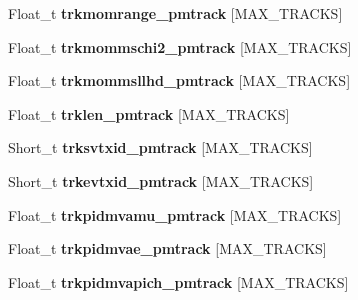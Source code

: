 \begin{DoxyCompactItemize}
\item 
\hypertarget{classanatree_a725421ebaec99bbeaacda2ea1df8ac54}{Float\-\_\-t {\bfseries trkmomrange\-\_\-pmtrack} \mbox{[}M\-A\-X\-\_\-\-T\-R\-A\-C\-K\-S\mbox{]}}\label{classanatree_a725421ebaec99bbeaacda2ea1df8ac54}

\item 
\hypertarget{classanatree_ad6f4b9a484529c39f413d31fdaa51664}{Float\-\_\-t {\bfseries trkmommschi2\-\_\-pmtrack} \mbox{[}M\-A\-X\-\_\-\-T\-R\-A\-C\-K\-S\mbox{]}}\label{classanatree_ad6f4b9a484529c39f413d31fdaa51664}

\item 
\hypertarget{classanatree_a7c538c0f882a2b346b7af037a89b9d00}{Float\-\_\-t {\bfseries trkmommsllhd\-\_\-pmtrack} \mbox{[}M\-A\-X\-\_\-\-T\-R\-A\-C\-K\-S\mbox{]}}\label{classanatree_a7c538c0f882a2b346b7af037a89b9d00}

\item 
\hypertarget{classanatree_a3aaceb331268e1053c107da3dead2769}{Float\-\_\-t {\bfseries trklen\-\_\-pmtrack} \mbox{[}M\-A\-X\-\_\-\-T\-R\-A\-C\-K\-S\mbox{]}}\label{classanatree_a3aaceb331268e1053c107da3dead2769}

\item 
\hypertarget{classanatree_a0fe8910856f14e542cf42c275b4fbb50}{Short\-\_\-t {\bfseries trksvtxid\-\_\-pmtrack} \mbox{[}M\-A\-X\-\_\-\-T\-R\-A\-C\-K\-S\mbox{]}}\label{classanatree_a0fe8910856f14e542cf42c275b4fbb50}

\item 
\hypertarget{classanatree_a98535a6464f1d6b57ca774be9ae120fc}{Short\-\_\-t {\bfseries trkevtxid\-\_\-pmtrack} \mbox{[}M\-A\-X\-\_\-\-T\-R\-A\-C\-K\-S\mbox{]}}\label{classanatree_a98535a6464f1d6b57ca774be9ae120fc}

\item 
\hypertarget{classanatree_ab5c98f63151205a8ba15f16c84ae580a}{Float\-\_\-t {\bfseries trkpidmvamu\-\_\-pmtrack} \mbox{[}M\-A\-X\-\_\-\-T\-R\-A\-C\-K\-S\mbox{]}}\label{classanatree_ab5c98f63151205a8ba15f16c84ae580a}

\item 
\hypertarget{classanatree_abe142c54cea5aa72c64f9d0009427bf9}{Float\-\_\-t {\bfseries trkpidmvae\-\_\-pmtrack} \mbox{[}M\-A\-X\-\_\-\-T\-R\-A\-C\-K\-S\mbox{]}}\label{classanatree_abe142c54cea5aa72c64f9d0009427bf9}

\item 
\hypertarget{classanatree_a19b43d87367d0bf4f363f0189c22840d}{Float\-\_\-t {\bfseries trkpidmvapich\-\_\-pmtrack} \mbox{[}M\-A\-X\-\_\-\-T\-R\-A\-C\-K\-S\mbox{]}}\label{classanatree_a19b43d87367d0bf4f363f0189c22840d}


\end{DoxyCompactItemize}
